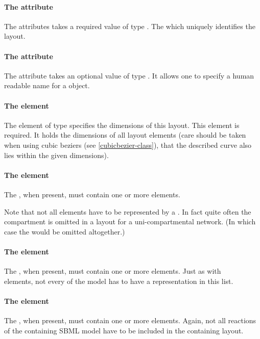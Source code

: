 \paragraph{The  attribute}
The  attributes takes a required value of type . 
The  which uniquely identifies the layout. 


\paragraph{The  attribute}
The  attribute takes an optional value of type 
. It allows one to specify a human readable name for a
\LayoutClass object.


\paragraph{The  element}
The  element of type \Dimensions specifies the 
dimensions of this layout. This element is required. It holds the 
dimensions of all layout elements (care should be taken when using cubic 
beziers (see \ref{cubicbezier-class}), that the described curve also lies 
within the given dimensions). 


\paragraph{The  element}
\label{listofcompartmentglyphs-class}
The , when present, must contain one or 
more \CompartmentGlyph elements. 

Note that not all \Compartment elements have to be represented by a 
\CompartmentGlyph. In fact quite often the compartment is omitted 
in a layout for a uni-compartmental network. (In which case the 
\ListOfCompartmentGlyphs would be omitted altogether.)


\paragraph{The  element}
\label{listofspeciesglyphs-class}
The , when present, must contain 
one or more \SpeciesGlyph elements. Just as with \\ \CompartmentGlyph 
elements, not every \Species of the model has to have a representation 
in this list.


\paragraph{The  element}
\label{listofreactionglyphs-class}
The , when present, must contain one or more 
\ReactionGlyph elements. Again, not all reactions of the containing SBML 
model have to be included in the containing layout. 


